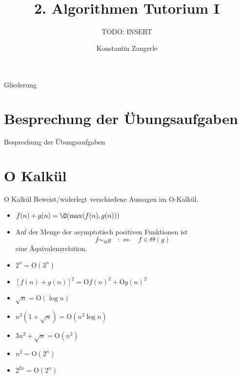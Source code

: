 \documentclass[18pt]{beamer}
\title[Algo I Tut]{2. Algorithmen Tutorium I}
\subtitle{TODO: INSERT}
\author[Zangerle]{Konstantin Zangerle}
\institute{Institut für Theoretische Informatik}
\newcommand{\Oh}{\mathrm{O}}
\begin{document}

\begin{frame}
\titlepage
\end{frame}

\begin{frame}{Gliederung}
 \tableofcontents
\end{frame}

\section{Besprechung der Übungsaufgaben}
\begin{frame}{Besprechung der Übungsaufgaben}
\end{frame}

\section{O Kalkül}
\begin{frame}{O Kalkül}
Beweist/widerlegt verschiedene Aussagen im O-Kalkül.
  \begin{itemize}
    \item $f(n) + g(n) = \O({\max(f(n),g(n))})$
    \item Auf der Menge der asymptotisch positiven Funktionen ist 
      $$f \sim_{\Theta} g \quad:\Longleftrightarrow\quad f \in \Theta(g)$$
      eine Äquivalenzrelation.
    \item $2^{n} = \Oh({3^n})$
    \item $[ f(n) + g(n) ]^2 = \Oh{f(n)^2} + \Oh{g(n)^2}$
    \item $\sqrt{n} = \Oh({{\log n}})$
    \item $n^2(1+\sqrt{n}) = \Oh({n^2 \log n})$
    \item $3n^2 + \sqrt{n} = \Oh({n^2})$
    \item $n^2 = \Oh({2^n})$
    \item $2^{2n} = \Oh({2^n})$
  \end{itemize}
\end{frame}
\end{document}
